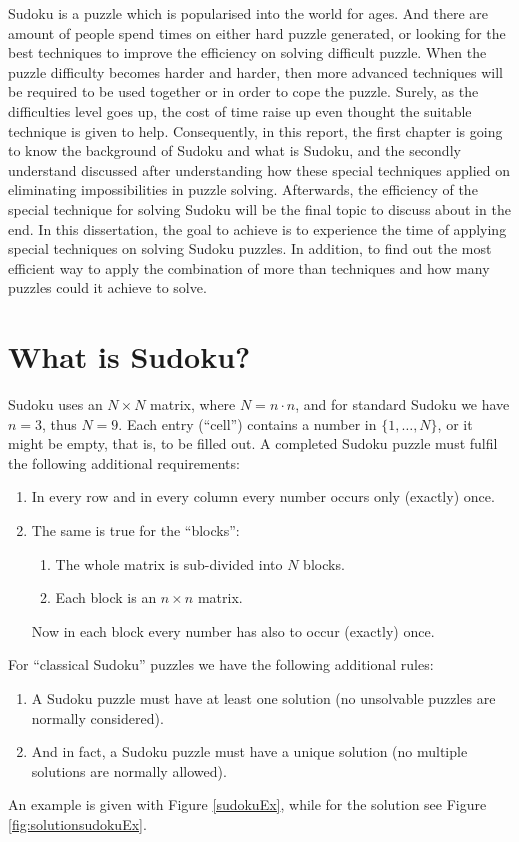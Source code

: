 \documentclass[11pt]{report}
\begin{document}
Sudoku is a puzzle which is popularised into the world for ages. And there are amount of people spend times on either hard puzzle generated, or looking for the best techniques to improve the efficiency on solving difficult puzzle.
When the puzzle difficulty becomes harder and harder, then more advanced techniques will be required to be used together or in order to cope the puzzle. Surely, as the difficulties level goes up, the cost of time raise up even thought the suitable technique is given to help. Consequently, in this report, the first chapter is going to know the background of Sudoku and what is Sudoku, and the secondly understand discussed after understanding how these special techniques applied on eliminating impossibilities in puzzle solving. Afterwards, the efficiency of the special technique for solving Sudoku will be the final topic to discuss about in the end.
In this dissertation, the goal to achieve is to experience the time of applying special techniques on solving Sudoku puzzles. In addition, to find out the most efficient way to apply the combination of more than techniques and how many puzzles could it achieve to solve.


\section{What is Sudoku?}
\label{sec:whatissudoku}

Sudoku uses an $N \times N$ matrix, where $N = n \cdot n$, and for standard Sudoku we have $n = 3$, thus $N = 9$. Each entry (``cell'') contains a number in $\{1, \dots, N\}$, or it might be empty, that is, to be filled out. A completed Sudoku puzzle must fulfil the following additional requirements:
\begin{enumerate}
\item In every row and in every column every number occurs only (exactly) once.
\item The same is true for the ``blocks'':
\begin{enumerate}
\item The whole matrix is sub-divided into $N$ blocks.
\item Each block is an $n \times n$ matrix.
\end{enumerate}
Now in each block every number has also to occur (exactly) once.
\end{enumerate}
For ``classical Sudoku'' puzzles we have the following additional rules:
\begin{enumerate}
\item A Sudoku puzzle must have at least one solution (no unsolvable puzzles are normally considered).
\item And in fact, a Sudoku puzzle must have a unique solution (no multiple solutions are normally allowed).
\end{enumerate}
An example is given with Figure \ref{sudokuEx}, while for the solution see Figure \ref{fig:solutionsudokuEx}.
\end{document}
